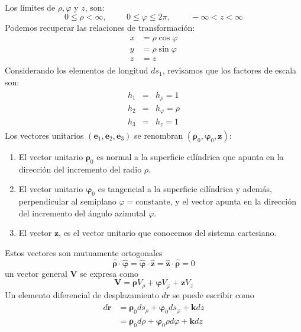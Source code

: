 Los límites de $\rho, \varphi$ y $z$, son:
\[ 0 \leq \rho < \infty, \hspace{1cm} 0 \leq \varphi \leq 2 \pi, \hspace{1cm} -\infty < z < \infty \]
Podemos recuperar las relaciones de transformación:
\begin{eqnarray}
\begin{aligned}
x &= \rho \cos \varphi \\
y &= \rho \sin \varphi \\
z &= z
\end{aligned}
\end{eqnarray}
Considerando los elementos de longitud $ds_{1}$, revisamos que los factores de escala son:
\begin{eqnarray}
\begin{aligned}
h_{1} &=& h_{\rho} = 1 \\
h_{2} &=& h_{\varphi} = \rho \\
h_{3} &=& h_{z} = 1
\end{aligned}
\end{eqnarray}
Los vectores unitarios $(\mathbf{e}_{1},\mathbf{e}_{2},\mathbf{e}_{3})$ se renombran $(\bm{\rho}_{0},\bm{\varphi}_{0},\mathbf{z})$:
\begin{enumerate}
\item El vector unitario $\bm{\rho}_{0}$ es normal a la superficie cilíndrica que apunta en la dirección del incremento del radio $\rho$.
\item El vector unitario $\bm{\varphi}_{0}$ es tangencial a la superficie cilíndrica y además, perpendicular al semiplano $\varphi=\text{constante}$, y el vector apunta en la dirección del incremento del ángulo azimutal $\varphi$.
\item El vector $\mathbf{z}$, es el vector unitario que conocemos del sistema cartesiano.
\end{enumerate}
Estos vectores son mutuamente ortogonales
\[ \bm{\widehat{\rho}} \cdot \bm{\widehat{\varphi}} = \bm{\widehat{\varphi}} \cdot \mathbf{\widehat{z}} = \mathbf{\widehat{z}} \cdot \bm{\widehat{\rho}} = 0  \]
un vector general $\mathbf{V}$ se expresa como
\[ \mathbf{V} =  \bm{\rho} V_{\rho} + \bm{\varphi} V_{\varphi} + \mathbf{z} V_{z} \]
Un elemento diferencial de desplazamiento $d\mathbf{r}$ se puede escribir como
\begin{eqnarray}
\begin{aligned}
d \mathbf{r} &= \bm{\rho}_{0} ds_{\rho} + \bm{\varphi}_{0} ds_{\varphi} + \mathbf{k} dz \\
&= \bm{\rho}_{0} d \rho + \bm{\varphi}_{0} \rho d \varphi + \mathbf{k} dz
\end{aligned}
\end{eqnarray}
